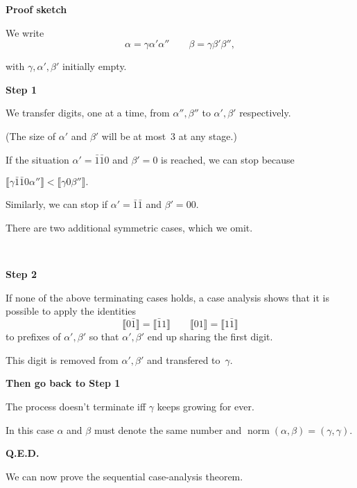 \documentclass{csslides-1.1}
\newcommand{\Meaning}[1]{\llbracket #1 \rrbracket}
\newcommand{\norm}{\operatorname{norm}}
\begin{document}
\begin{slide}{}

{\bf Proof sketch}

\vfill

We write
\[
\alpha  =  \gamma \alpha' \alpha''
\qquad
\beta   =  \gamma \beta' \beta'',
\]

with $\gamma, \alpha',\beta'$ initially empty.

\vfill

{\bf Step 1}

We transfer digits, one at a time, from $\alpha'',\beta''$ to
$\alpha',\beta'$ respectively.

(The size of $\alpha'$ and $\beta'$ will be at most~$3$ at any stage.)


\vfill
If the situation $\alpha' = \bar{1}\bar{1}0$ and $\beta'=0$ is reached, we
can stop because

\qquad $ \Meaning{\gamma \bar{1} \bar{1} 0 \alpha''} < \Meaning{\gamma
  0 \beta''}. $

Similarly, we can stop if $\alpha'=\bar{1}\bar{1}$ and $\beta'=00$.

There are two additional symmetric cases, which we omit.

\vfill

\end{slide}

\begin{slide}{}

~\vfill

{\bf Step 2}
  


If none of the above terminating cases holds, a case analysis shows
that it is possible to apply the identities
\[
\Meaning{0 \bar{1}}  =  \Meaning{\bar{1} 1}
\qquad 
\Meaning{0 1}  =  \Meaning{1\bar{1}}
\]
to prefixes of $\alpha',\beta'$ so that $\alpha',\beta'$
end up sharing the first digit.

\vfill

This digit is removed from $\alpha',\beta'$ and transfered to~$\gamma$.


\vfill

{\bf Then go back to Step 1}




\vfill

The process doesn't terminate iff $\gamma$ keeps growing for ever.


\vfill

In this case $\alpha$ and $\beta$ must denote the same number and
$\norm(\alpha,\beta)=(\gamma,\gamma)$.

{\bf Q.E.D.}


\vfill

We can now prove the sequential case-analysis theorem.

\vfill

\end{slide}
\end{document}
